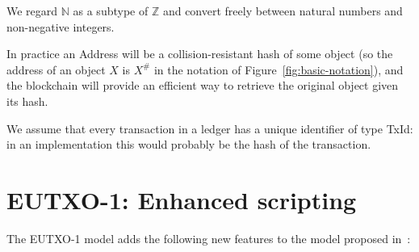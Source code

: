\documentclass[a4paper]{article}
\newcommand{\s}{\textsf}  %
\newcommand\N{\ensuremath{\mathbb{N}}}
\newcommand\Z{\ensuremath{\mathbb{Z}}}
\begin{document}
\noindent We regard $\N$ as a subtype of $\Z$ and convert freely between
natural numbers and non-negative integers.

\medskip
\noindent In practice an \textsf{Address} will be a
collision-resistant hash of some object (so the address of an object
$X$ is $X^{\#}$ in the notation of Figure~\ref{fig:basic-notation}),
and the blockchain will provide an efficient way to retrieve the
original object given its hash.


\medskip
\noindent We assume that every transaction in a ledger has a unique identifier
of type \s{TxId}: in an implementation this would probably be the
hash of the transaction.





\section{EUTXO-1: Enhanced scripting}
\label{sec:eutxo-1}
The EUTXO-1 model adds the following new features to the model 
proposed in~\citep{Zahnentferner18-UTxO}:
\end{document}
